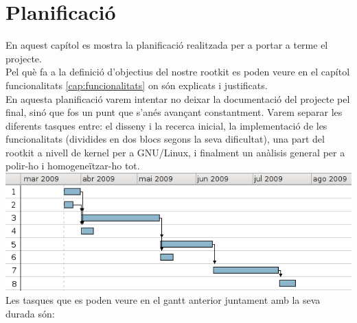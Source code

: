 \chapter{Planificació}

En aquest capítol es mostra la planificació realitzada per a portar a terme el projecte. \\

Pel què fa a la definició d'objectius del nostre rootkit es poden veure en el capítol
funcionalitats \ref{cap:funcionalitats} on són explicats i justificats. \\

En aquesta planificació varem intentar no deixar la documentació del projecte pel final, 
sinó que fos un punt que s'anés avançant constantment. Varem separar les diferents tasques entre: el disseny
i la recerca inicial, la implementació de les funcionalitats (dividides en dos blocs segons la seva dificultat),
una part del rootkit a nivell de kernel per a GNU/Linux, i finalment un anàlisis general per a polir-ho
i homogeneïtzar-ho tot. \\

\includegraphics[scale=0.75,keepaspectratio]{primer_gantt2.png} 
\\
Les tasques que es poden veure en el gantt anterior juntament amb la seva durada són:


